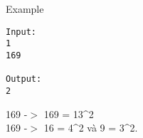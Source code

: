 Example
\begin{verbatim}
Input:
1
169

Output:
2
\end{verbatim}

169 -$>$ 169 = 13^2
\\169 -$>$ 16 = 4^2 và 9 = 3^2.